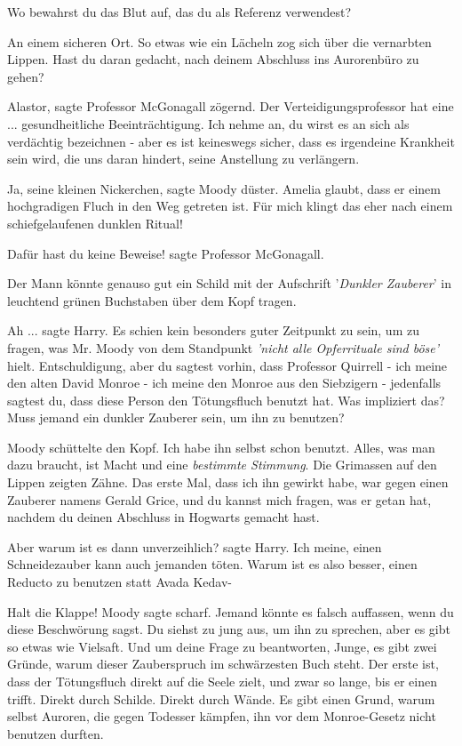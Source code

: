 \glqq Wo bewahrst du das Blut auf, das du als Referenz verwendest?\grqq{}

\glqq An einem sicheren Ort.\grqq{} So etwas wie ein Lächeln zog sich über die
vernarbten Lippen. \glqq Hast du daran gedacht, nach deinem Abschluss ins
Aurorenbüro zu gehen?\grqq{}

\glqq Alastor\grqq{}, sagte Professor McGonagall zögernd. \glqq Der
Verteidigungsprofessor hat eine ... gesundheitliche Beeinträchtigung. Ich nehme
an, du wirst es an sich als verdächtig bezeichnen - aber es ist keineswegs
sicher, dass es irgendeine Krankheit sein wird, die uns daran hindert, seine
Anstellung zu verlängern.\grqq{}

\glqq Ja, seine kleinen Nickerchen\grqq{}, sagte Moody düster. \glqq Amelia
glaubt, dass er einem hochgradigen Fluch in den Weg getreten ist. Für mich
klingt das eher nach einem schiefgelaufenen dunklen Ritual!\grqq{}

\glqq Dafür hast du keine Beweise!\grqq{} sagte Professor McGonagall.

\glqq Der Mann könnte genauso gut ein Schild mit der Aufschrift '\emph{Dunkler
Zauberer}' in leuchtend grünen Buchstaben über dem Kopf tragen.\grqq{}

\glqq Ah ...\grqq{} sagte Harry. Es schien kein besonders guter Zeitpunkt zu
sein, um zu fragen, was Mr. Moody von dem Standpunkt \emph{'nicht alle
Opferrituale sind böse'} hielt. \glqq Entschuldigung, aber du sagtest vorhin,
dass Professor Quirrell - ich meine den alten David Monroe - ich meine den
Monroe aus den Siebzigern - jedenfalls sagtest du, dass diese Person den
Tötungsfluch benutzt hat. Was impliziert das? Muss jemand ein dunkler Zauberer
sein, um ihn zu benutzen?\grqq{}

Moody schüttelte den Kopf. \glqq Ich habe ihn selbst schon benutzt. Alles, was
man dazu braucht, ist Macht und eine \emph{bestimmte Stimmung}.\grqq{} Die
Grimassen auf den Lippen zeigten Zähne. \glqq Das erste Mal, dass ich ihn
gewirkt habe, war gegen einen Zauberer namens Gerald Grice, und du kannst mich
fragen, was er getan hat, nachdem du deinen Abschluss in Hogwarts gemacht
hast.\grqq{}

\glqq Aber warum ist es dann unverzeihlich?\grqq{} sagte Harry. \glqq Ich meine,
einen Schneidezauber kann auch jemanden töten. Warum ist es also besser, einen
Reducto zu benutzen statt Avada Kedav-\grqq{}

\glqq Halt die Klappe!\grqq{} Moody sagte scharf. \glqq Jemand könnte es falsch
auffassen, wenn du diese Beschwörung sagst. Du siehst zu jung aus, um ihn zu
sprechen, aber es gibt so etwas wie Vielsaft. Und um deine Frage zu beantworten,
Junge, es gibt zwei Gründe, warum dieser Zauberspruch im schwärzesten Buch
steht. Der erste ist, dass der Tötungsfluch direkt auf die Seele zielt, und zwar
so lange, bis er einen trifft. Direkt durch Schilde. Direkt durch Wände. Es gibt
einen Grund, warum selbst Auroren, die gegen Todesser kämpfen, ihn vor dem
Monroe-Gesetz nicht benutzen durften.\grqq{}

